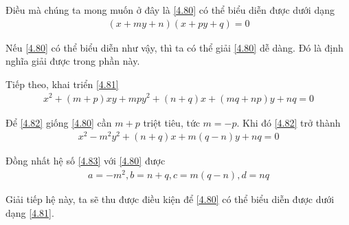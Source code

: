 \documentclass[a4paper,oneside]{book}
\numberwithin{equation}{chapter}
\begin{document}
Điều mà chúng ta mong muốn ở đây là \eqref{4.80} có thể biểu diễn được dưới dạng
\begin{align}
\label{4.81}
\left( {x + my + n} \right)\left( {x + py + q} \right) = 0
\end{align}

Nếu \eqref{4.80} có thể biểu diễn như vậy, thì ta có thể giải \eqref{4.80} dễ dàng. Đó là định nghĩa giải được trong phần này.

Tiếp theo, khai triển \eqref{4.81}
\begin{align}
\label{4.82}
{x^2} + \left( {m + p} \right)xy + mp{y^2} + \left( {n + q} \right)x + \left( {mq + np} \right)y + nq = 0
\end{align}

Để \eqref{4.82} giống \eqref{4.80} cần $m+p$ triệt tiêu, tức $m=-p$. Khi đó \eqref{4.82} trở thành
\begin{align}
\label{4.83}
{x^2} - {m^2}{y^2} + \left( {n + q} \right)x + m\left( {q - n} \right)y + nq = 0
\end{align}

Đồng nhất hệ số \eqref{4.83} với \eqref{4.80} được
\begin{align}
a =  - {m^2},b = n + q,c = m\left( {q - n} \right),d = nq
\end{align}

Giải tiếp hệ này, ta sẽ thu được điều kiện để \eqref{4.80} có thể biểu diễn được dưới dạng \eqref{4.81}.
\end{document}

